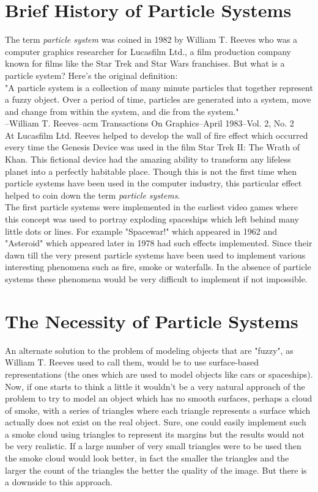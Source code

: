 \section{Brief History of Particle Systems}
The term \textit{particle system} was coined in 1982 by William T. Reeves who was a computer graphics researcher for Lucasfilm Ltd., a film production company known for films like the Star Trek and Star Wars franchises. But what is a particle system? Here's the original definition:\\

"A particle system is a collection of many minute particles that together represent a fuzzy object. Over a period of time, particles are generated into a system, move and change from within the system, and die from the system."\\

--William T. Reeves--acm Transactions On Graphics--April 1983--Vol. 2, No. 2\\

At Lucasfilm Ltd. Reeves helped to develop the wall of fire effect which occurred every time the Genesis Device was used in the film Star Trek II: The Wrath of Khan. This fictional device had the amazing ability to transform any lifeless planet into a perfectly habitable place. Though this is not the first time when particle systems have been used in the computer industry, this particular effect helped to coin down the term \textit{particle systems}.\\ 

The first particle systems were implemented in the earliest video games where this concept was used to portray exploding spaceships which left behind many little dots or lines. For example "Spacewar!" which appeared in 1962 and "Asteroid" which appeared later in 1978 had such effects implemented. Since their dawn till the very present particle systems have been used to implement various interesting phenomena such as fire, smoke or waterfalls. In the absence of particle systems these phenomena would be very difficult to implement if not impossible.\\
\newpage
\section{The Necessity of Particle Systems}
An alternate solution to the problem of modeling objects that are "fuzzy", as William T. Reeves used to call them, would be to use surface-based representations (the ones which are used to model objects like cars or spaceships). Now, if one starts to think a little it wouldn't be a very natural approach of the problem to try to model an object which has no smooth surfaces, perhaps a cloud of smoke, with a series of triangles where each triangle represents a surface which actually does not exist on the real object. Sure, one could easily implement such a smoke cloud using triangles to represent its margins but the results would not be very realistic. If a large number of very small triangles were to be used then the smoke cloud would look better, in fact the smaller the triangles and the larger the count of the triangles the better the quality of the image. But there is a downside to this approach.\\

